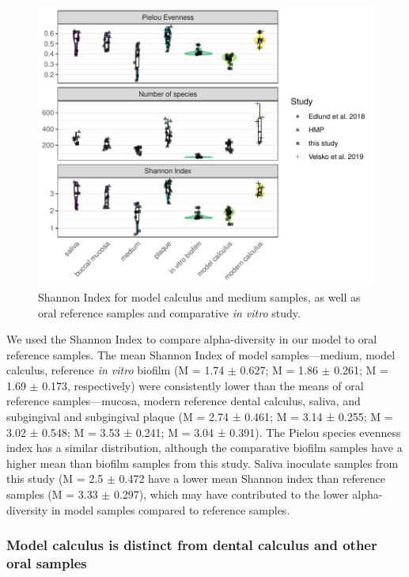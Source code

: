 \documentclass[
]{article}
\begin{document}
\begin{figure}

{\centering \includegraphics{index_files/figure-pdf/fig-shannon-compar-1.pdf}

}

\caption{\label{fig-shannon-compar}Shannon Index for model calculus and
medium samples, as well as oral reference samples and comparative
\emph{in vitro} study.}

\end{figure}

We used the Shannon Index to compare alpha-diversity in our model to
oral reference samples. The mean Shannon Index of model
samples---medium, model calculus, reference \emph{in vitro} biofilm (M =
1.74 \(\pm\) 0.627; M = 1.86 \(\pm\) 0.261; M = 1.69 \(\pm\) 0.173,
respectively) were consistently lower than the means of oral reference
samples---mucosa, modern reference dental calculus, saliva, and
subgingival and subgingival plaque (M = 2.74 ± 0.461; M = 3.14 ± 0.255;
M = 3.02 ± 0.548; M = 3.53 ± 0.241; M = 3.04 ± 0.391). The Pielou
species evenness index has a similar distribution, although the
comparative biofilm samples have a higher mean than biofilm samples from
this study. Saliva inoculate samples from this study (M = 2.5 \(\pm\)
0.472 have a lower mean Shannon index than reference samples (M = 3.33
\(\pm\) 0.297), which may have contributed to the lower alpha-diversity
in model samples compared to reference samples.

\hypertarget{model-calculus-is-distinct-from-dental-calculus-and-other-oral-samples}{%
\subsubsection{Model calculus is distinct from dental calculus and other
oral
samples}\label{model-calculus-is-distinct-from-dental-calculus-and-other-oral-samples}}
\end{document}
